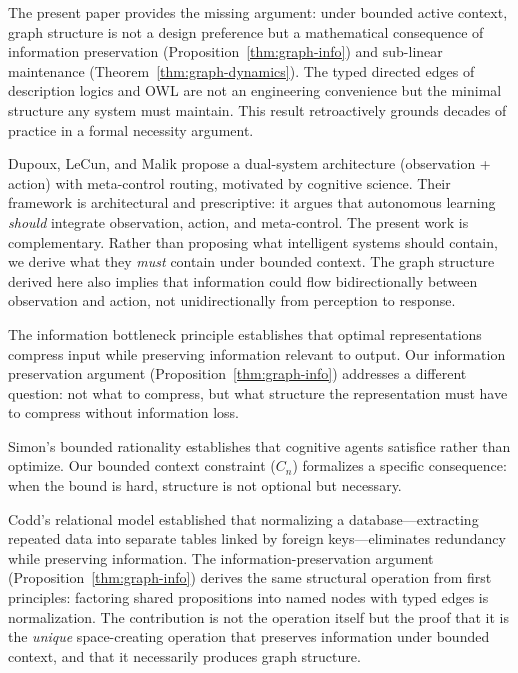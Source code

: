 \documentclass[11pt]{article}
\theoremstyle{definition}
\begin{document}
The present paper provides the missing argument: under bounded active
context, graph structure is not a design preference but a
mathematical consequence of information preservation
(Proposition~\ref{thm:graph-info}) and sub-linear maintenance
(Theorem~\ref{thm:graph-dynamics}). The typed directed edges of
description logics and OWL are not an engineering convenience but the
minimal structure any system must maintain. This result retroactively
grounds decades of practice in a formal necessity argument.

Dupoux, LeCun, and Malik \cite{DupouxLeCunMalik2026} propose a
dual-system architecture (observation + action) with meta-control
routing, motivated by cognitive science. Their framework is
architectural and prescriptive: it argues that autonomous learning
\emph{should} integrate observation, action, and meta-control. The
present work is complementary. Rather than proposing what intelligent
systems should contain, we derive what they \emph{must} contain under
bounded context. The graph structure derived here also implies that
information could flow bidirectionally between observation and action,
not unidirectionally from perception to response.

The information bottleneck principle \cite{Tishby2000} establishes that
optimal representations compress input while preserving information
relevant to output. Our information preservation argument
(Proposition~\ref{thm:graph-info}) addresses a different question: not what
to compress, but what structure the representation must have to compress
without information loss.

Simon's bounded rationality \cite{Simon1955} establishes that cognitive
agents satisfice rather than optimize. Our bounded context constraint
($C_n$) formalizes a specific consequence: when the bound is hard,
structure is not optional but necessary.

Codd's relational model \cite{Codd1970} established that normalizing
a database---extracting repeated data into separate tables linked by
foreign keys---eliminates redundancy while preserving information.
The information-preservation argument (Proposition~\ref{thm:graph-info})
derives the same structural operation from first principles: factoring
shared propositions into named nodes with typed edges is normalization.
The contribution is not the operation itself but the proof that it is
the \emph{unique} space-creating operation that preserves information
under bounded context, and that it necessarily produces graph structure.
\end{document}
